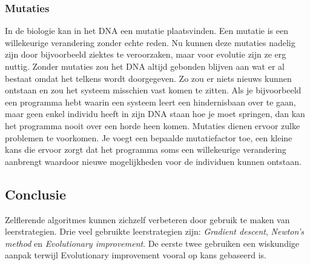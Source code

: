 \subsubsection{Mutaties}
In de biologie kan in het DNA een mutatie plaatsvinden. Een mutatie is een willekeurige verandering zonder echte reden. Nu kunnen deze mutaties nadelig zijn door bijvoorbeeld ziektes te veroorzaken, maar voor evolutie zijn ze erg nuttig. Zonder mutaties zou het DNA altijd gebonden blijven aan wat er al bestaat omdat het telkens wordt doorgegeven. Zo zou er niets nieuws kunnen ontstaan en zou het systeem misschien vast komen te zitten. Als je bijvoorbeeld een programma hebt waarin een systeem leert een hindernisbaan over te gaan, maar geen enkel individu heeft in zijn DNA staan hoe je moet springen, dan kan het programma nooit over een horde heen komen. Mutaties dienen ervoor zulke problemen te voorkomen. Je voegt een bepaalde mutatiefactor toe, een kleine kans die ervoor zorgt dat het programma soms een willekeurige verandering aanbrengt waardoor nieuwe mogelijkheden voor de individuen kunnen ontstaan.

\subsection{Conclusie}
Zelflerende algoritmes kunnen zichzelf verbeteren door gebruik te maken van leerstrategien. Drie veel gebruikte leerstrategien zijn: \textit{Gradient descent}, \textit{Newton's method} en \textit{Evolutionary improvement}. De eerste twee gebruiken een wiskundige aanpak  terwijl Evolutionary improvement vooral op kans gebaseerd is.
